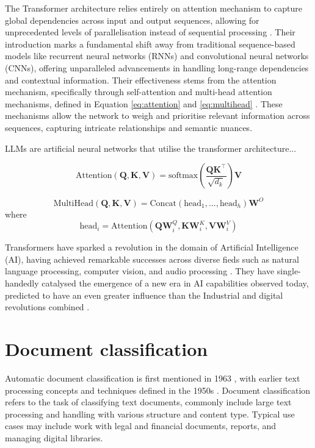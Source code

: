 The Transformer architecture relies entirely on attention mechanism to capture global dependencies across input and output sequences, allowing for unprecedented levels of parallelisation instead of sequential processing \cite{vaswani-2023-attention}. Their introduction marks a fundamental shift away from traditional sequence-based models like recurrent neural networks (RNNs) and convolutional neural networks (CNNs), offering unparalleled advancements in handling long-range dependencies and contextual information. Their effectiveness stems from the attention mechanism, specifically through self-attention and multi-head attention mechanisms, defined in Equation \eqref{eq:attention} and \eqref{eq:multihead} \cite{vaswani-2023-attention}. These mechanisms allow the network to weigh and prioritise relevant information across sequences, capturing intricate relationships and semantic nuances.

LLMs are artificial neural networks that utilise the transformer architecture...

\begin{equation}
    \label{eq:attention}
    \text{Attention}(\mathbf{Q}, \mathbf{K}, \mathbf{V}) = \text{softmax}\left( \frac{\mathbf{Q}\mathbf{K}^\top}{\sqrt{d_k}} \right) \mathbf{V}
\end{equation}

\begin{equation}
    \label{eq:multihead}
    \text{MultiHead}(\mathbf{Q}, \mathbf{K}, \mathbf{V}) = \text{Concat}(\text{head}_1, \ldots, \text{head}_h) \mathbf{W}^O
\end{equation}
where
\[
    \text{head}_i = \text{Attention}(\mathbf{Q} \mathbf{W}^Q_i, \mathbf{K} \mathbf{W}^K_i, \mathbf{V} \mathbf{W}^V_i)
\]

Transformers have sparked a revolution in the domain of Artificial Intelligence (AI), having achieved remarkable successes across diverse fieds such as natural language processing, computer vision, and audio processing \cite{lin-2022-survey-transformers}. They have single-handedly catalysed the emergence of a new era in AI capabilities observed today, predicted to have an even greater influence than the Industrial and digital revolutions combined \cite{makridakis-2017-ai-revolution}.


\section{Document classification}

Automatic document classification is first mentioned in 1963 \cite{borko-1963-auto-doc-classification}, with earlier text processing concepts and techniques defined in the 1950s \cite{luhn-1958-business-intelligence-system}. Document classification refers to the task of classifying text documents, commonly include large text processing and handling with various structure and content type. Typical use cases may include work with legal and financial documents, reports, and managing digital libraries.

